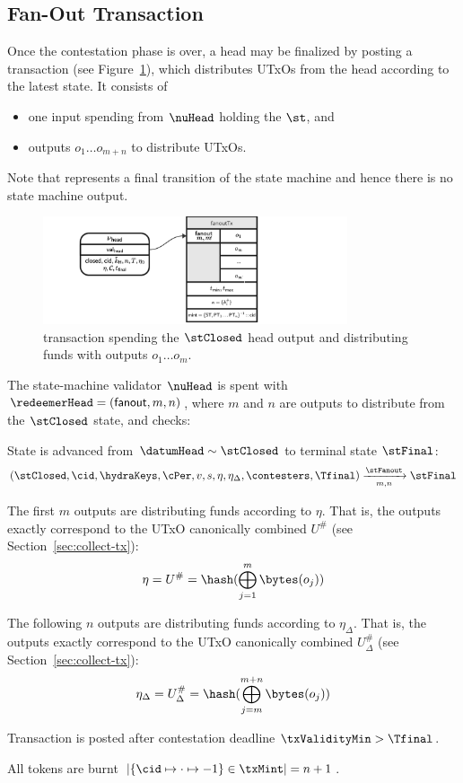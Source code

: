 \subsection{Fan-Out Transaction}\label{sec:fanout-tx}

Once the contestation phase is over, a head may be finalized by posting a
\mtxFanout{} transaction (see Figure~\ref{fig:fanoutTx}), which
distributes UTxOs from the head according to the latest state. It consists of
\begin{itemize}
  \item one input spending from $\nuHead$ holding the $\st$, and
  \item outputs $o_{1} \dots o_{m+n}$ to distribute UTxOs.
\end{itemize}

Note that \mtxFanout{} represents a final transition of the state machine and
hence there is no state machine output.

\begin{figure}
  \centering
  \includegraphics[width=0.8\textwidth]{Hydra/Protocol/Figures/fanoutTx.pdf}
  \caption{\mtxFanout{} transaction spending the $\stClosed$ head output and
	distributing funds with outputs $o_{1} \dots o_{m}$.}\label{fig:fanoutTx}
\end{figure}

\noindent The state-machine validator $\nuHead$ is spent with
$\redeemerHead = (\mathsf{fanout}, m, n)$, where $m$ and $n$ are
outputs to distribute from the $\stClosed$ state, and checks:
\begin{menumerate}
  \item State is advanced from $\datumHead \sim \stClosed$ to terminal state
  $\stFinal$: %
  \[
	(\stClosed,\cid,\hydraKeys,\cPer,v, s,\eta,\eta_{\Delta},\contesters,\Tfinal) \xrightarrow[m,n]{\stFanout} \stFinal
  \]
  \item The first $m$ outputs are distributing funds according to $\eta$. That is,
  the outputs exactly correspond to the UTxO canonically combined $U^{\#}$ (see
  Section~\ref{sec:collect-tx}):
  \[
	\eta = U^{\#} = \hash(\bigoplus_{j=1}^{m} \bytes(o_{j}))
  \]
  \item The following $n$ outputs are distributing funds according to
  $\eta_{\Delta}$. That is, the outputs exactly correspond to the UTxO canonically
  combined $U^{\#}_{\Delta}$ (see Section~\ref{sec:collect-tx}):
  \[
	\eta_{\Delta} = U^{\#}_{\Delta} = \hash(\bigoplus_{j=m}^{m+n} \bytes(o_{j}))
  \]
  \item Transaction is posted after contestation deadline $\txValidityMin > \Tfinal$.
  \item All tokens are burnt
  $|\{\cid \mapsto \cdot \mapsto -1\} \in \txMint| = n + 1$.
\end{menumerate}


